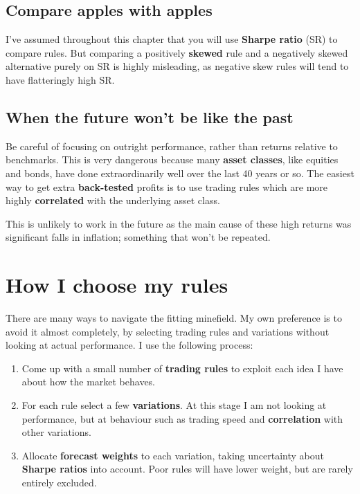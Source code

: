 \subsection*{Compare apples with apples}

I've assumed throughout this chapter that you will use \textbf{Sharpe ratio} (SR) to compare rules. But comparing a positively \textbf{skewed} rule and a negatively skewed alternative purely on SR is highly misleading, as negative skew rules will tend to have flatteringly high SR.

\subsection*{When the future won't be like the past}

Be careful of focusing on outright performance, rather than returns relative to benchmarks. This is very dangerous because many \textbf{asset classes}, like equities and bonds, have done extraordinarily well over the last 40 years or so. The easiest way to get extra \textbf{back-tested} profits is to use trading rules which are more highly \textbf{correlated} with the underlying asset class.

This is unlikely to work in the future as the main cause of these high returns was significant falls in inflation; something that won't be repeated.

\section*{How I choose my rules}  {}

There are many ways to navigate the fitting minefield. My own preference is to avoid it almost completely, by selecting trading rules and variations without looking at actual performance. I use the following process:

\begin{enumerate}
\item Come up with a small number of \textbf{trading rules} to exploit each idea I have about how the market behaves.
\item For each rule select a few \textbf{variations}. At this stage I am not looking at performance, but at behaviour such as trading speed and \textbf{correlation} with other variations.
\item Allocate \textbf{forecast weights} to each variation, taking uncertainty about \textbf{Sharpe ratios} into account. Poor rules will have lower weight, but are rarely entirely excluded. \end{enumerate}

